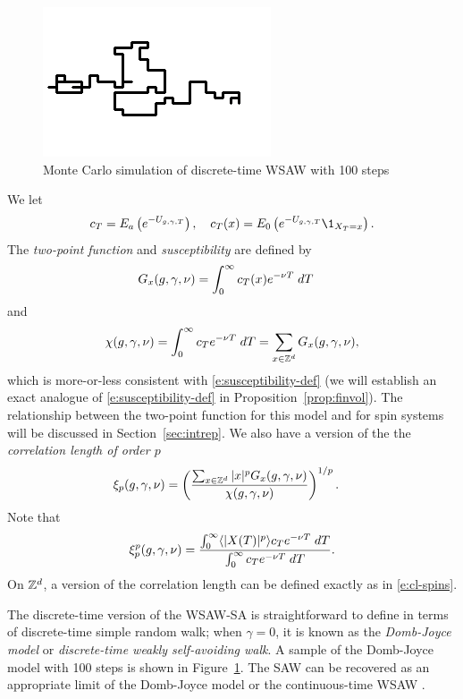 \begin{figure}[!htb]
\centering
\label{fig:domb-joyce}
\includegraphics{domb-joyce-black-small.png}
\caption{Monte Carlo simulation of discrete-time WSAW with 100 steps}
\end{figure}

We let
\begin{equation}
\label{e:c}
    c_T = E_a\left(e^{-U_{\gcc,\gamma,T}}\right),
    \quad
    c_T(x) = E_0\left(e^{-U_{\gcc,\gamma,T}}\1_{X_T = x}\right).
\end{equation}
The \emph{two-point function} and \emph{susceptibility} are defined by
\begin{align}
\lbeq{Gsa}
G_x(\gcc,\gamma,\nu)
    &=
\int_0^\infty c_T(x) e^{-\nu T} \; dT
\end{align}
and
\begin{equation}
\label{e:suscept-def}
\chi(g, \gamma, \nu)
	=
\int_0^\infty c_T e^{-\nu T} \; dT
	=
\sum_{x\in{ {{\mathbb Z}}^d }} G_x(g,\gamma,\nu),
\end{equation}
which is more-or-less consistent with \eqref{e:susceptibility-def} (we will
establish an exact analogue of \eqref{e:susceptibility-def} in Proposition~\ref{prop:finvol}).
The relationship
between the two-point function for this model and for spin systems will be
discussed in Section~\ref{sec:intrep}. We also have a version of the
the \emph{correlation length of order $p$}
\begin{align}
\label{e:clp-wsawsa}
\xi_p(g, \gamma, \nu)
	&=
\left(\frac{\sum_{x\in{ {{\mathbb Z}}^d }} |x|^p G_x(g, \gamma, \nu)}{\chi(g, \gamma, \nu)}\right)^{1/p}.
\end{align}
Note that
\begin{equation}
\xi_p^p(g,\gamma,\nu)
	=
\frac
{\int_0^\infty \langle |X(T)|^p \rangle c_T e^{-\nu T} \; dT}
{\int_0^\infty c_T e^{-\nu T} \; dT}.
\end{equation}
On ${ {{\mathbb Z}}^d }$, a version of the correlation length can be defined exactly as in \eqref{e:cl-spins}.

The discrete-time version of the WSAW-SA is straightforward to define in terms of
discrete-time simple random walk; when
$\gamma = 0$, it is known as the \emph{Domb-Joyce model} or \emph{discrete-time
weakly self-avoiding walk}. A sample of the Domb-Joyce model with 100 steps is shown
in Figure~\ref{fig:domb-joyce}. The SAW can be recovered as an
appropriate limit of the Domb-Joyce model or the continuous-time WSAW \cite{BDS12}.

